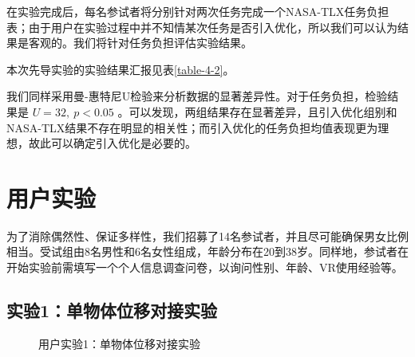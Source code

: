 在实验完成后，每名参试者将分别针对两次任务完成一个NASA-TLX任务负担表；由于用户在实验过程中并不知情某次任务是否引入优化，所以我们可以认为结果是客观的。我们将针对任务负担评估实验结果。

本次先导实验的实验结果汇报见表\ref{table-4-2}。

我们同样采用曼-惠特尼U检验来分析数据的显著差异性。对于任务负担，检验结果是 $U = 32,\ p < 0.05$ 。可以发现，两组结果存在显著差异，且引入优化组别和NASA-TLX结果不存在明显的相关性；而引入优化的任务负担均值表现更为理想，故此可以确定引入优化是必要的。

\section{用户实验}

为了消除偶然性、保证多样性，我们招募了14名参试者，并且尽可能确保男女比例相当。受试组由8名男性和6名女性组成，年龄分布在20到38岁。同样地，参试者在开始实验前需填写一个个人信息调查问卷，以询问性别、年龄、VR使用经验等。

\subsection{实验1：单物体位移对接实验}

\begin{figure}[b!]
    \centering
    \hspace{5em} %
    \caption{用户实验1：单物体位移对接实验}
    \label{fig-4-1}
\end{figure}

